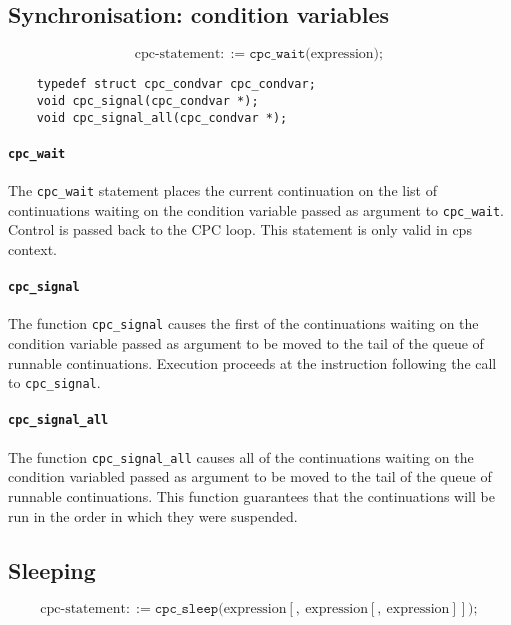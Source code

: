 \documentclass[a4paper]{report}
\begin{document}
\subsection{Synchronisation: condition variables}

\[ \mbox{cpc-statement} ::=
   \mathtt{cpc\_wait} \mathtt{(} \mbox{expression} \mathtt{)} \mathtt{;} \]

\begin{verbatim}
    typedef struct cpc_condvar cpc_condvar;
    void cpc_signal(cpc_condvar *);
    void cpc_signal_all(cpc_condvar *);
\end{verbatim}

\paragraph{\tt cpc\_wait} The {\tt cpc\_wait} statement places the
current continuation on the list of continuations waiting on the
condition variable passed as argument to {\tt cpc\_wait}.  Control is
passed back to the CPC loop.  This statement is only valid in cps
context.

\paragraph{\tt cpc\_signal} The function {\tt cpc\_signal} causes the
first of the continuations waiting on the condition variable passed as
argument to be moved to the tail of the queue of runnable
continuations.  Execution proceeds at the instruction following the
call to {\tt cpc\_signal}.

\paragraph{\tt cpc\_signal\_all} The function {\tt cpc\_signal\_all}
causes all of the continuations waiting on the condition variabled
passed as argument to be moved to the tail of the queue of runnable
continuations.  This function guarantees that the continuations will
be run in the order in which they were suspended.

\subsection{Sleeping}

\[ \mbox{cpc-statement} ::=
     \mathtt{cpc\_sleep} \mathtt{(} \mbox{expression}
                                   [ \mathtt{,}\ \mbox{expression}
                                     [ \mathtt{,}\
                                         \mbox{expression} ]]
                         \mathtt{)} \mathtt{;} \]
\end{document}
